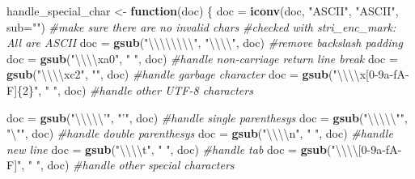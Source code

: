 \documentclass[]{article}
\newenvironment{Shaded}{\begin{snugshade}}{\end{snugshade}}
\newcommand{\CharTok}[1]{\textcolor[rgb]{0.31,0.60,0.02}{#1}}
\newcommand{\CommentTok}[1]{\textcolor[rgb]{0.56,0.35,0.01}{\textit{#1}}}
\newcommand{\ControlFlowTok}[1]{\textcolor[rgb]{0.13,0.29,0.53}{\textbf{#1}}}
\newcommand{\DataTypeTok}[1]{\textcolor[rgb]{0.13,0.29,0.53}{#1}}
\newcommand{\KeywordTok}[1]{\textcolor[rgb]{0.13,0.29,0.53}{\textbf{#1}}}
\newcommand{\NormalTok}[1]{#1}
\newcommand{\StringTok}[1]{\textcolor[rgb]{0.31,0.60,0.02}{#1}}
\begin{document}
\begin{Shaded}
\begin{Highlighting}[]
\NormalTok{handle_special_char <-}\StringTok{ }\ControlFlowTok{function}\NormalTok{(doc)}
\NormalTok{\{}
\NormalTok{  doc =}\StringTok{ }\KeywordTok{iconv}\NormalTok{(doc, }\StringTok{"ASCII"}\NormalTok{, }\StringTok{"ASCII"}\NormalTok{, }\DataTypeTok{sub=}\StringTok{""}\NormalTok{) }\CommentTok{#make sure there are no invalid chars}
                                             \CommentTok{#checked with stri_enc_mark: All are ASCII}
\NormalTok{  doc =}\StringTok{ }\KeywordTok{gsub}\NormalTok{(}\StringTok{"}\CharTok{\textbackslash{}\textbackslash{}\textbackslash{}\textbackslash{}\textbackslash{}\textbackslash{}\textbackslash{}\textbackslash{}}\StringTok{"}\NormalTok{, }\StringTok{"}\CharTok{\textbackslash{}\textbackslash{}\textbackslash{}\textbackslash{}}\StringTok{"}\NormalTok{, doc) }\CommentTok{#remove backslash padding}
\NormalTok{  doc =}\StringTok{ }\KeywordTok{gsub}\NormalTok{(}\StringTok{"}\CharTok{\textbackslash{}\textbackslash{}\textbackslash{}\textbackslash{}}\StringTok{xa0"}\NormalTok{, }\StringTok{" "}\NormalTok{, doc) }\CommentTok{#handle non-carriage return line break}
\NormalTok{  doc =}\StringTok{ }\KeywordTok{gsub}\NormalTok{(}\StringTok{"}\CharTok{\textbackslash{}\textbackslash{}\textbackslash{}\textbackslash{}}\StringTok{xc2"}\NormalTok{, }\StringTok{""}\NormalTok{, doc) }\CommentTok{#handle garbage character}
\NormalTok{  doc =}\StringTok{ }\KeywordTok{gsub}\NormalTok{(}\StringTok{"}\CharTok{\textbackslash{}\textbackslash{}\textbackslash{}\textbackslash{}}\StringTok{x[0-9a-fA-F]\{2\}"}\NormalTok{, }\StringTok{" "}\NormalTok{, doc) }\CommentTok{#handle other UTF-8 characters}
  
\NormalTok{  doc =}\StringTok{ }\KeywordTok{gsub}\NormalTok{(}\StringTok{"}\CharTok{\textbackslash{}\textbackslash{}\textbackslash{}\textbackslash{}\textbackslash{}'}\StringTok{"}\NormalTok{, }\StringTok{"'"}\NormalTok{, doc) }\CommentTok{#handle single parenthesys}
\NormalTok{  doc =}\StringTok{ }\KeywordTok{gsub}\NormalTok{(}\StringTok{"}\CharTok{\textbackslash{}\textbackslash{}\textbackslash{}\textbackslash{}\textbackslash{}"}\StringTok{"}\NormalTok{, }\StringTok{"}\CharTok{\textbackslash{}"}\StringTok{"}\NormalTok{, doc) }\CommentTok{#handle double parenthesys}
\NormalTok{  doc =}\StringTok{ }\KeywordTok{gsub}\NormalTok{(}\StringTok{"}\CharTok{\textbackslash{}\textbackslash{}\textbackslash{}\textbackslash{}}\StringTok{n"}\NormalTok{, }\StringTok{" "}\NormalTok{, doc) }\CommentTok{#handle new line}
\NormalTok{  doc =}\StringTok{ }\KeywordTok{gsub}\NormalTok{(}\StringTok{"}\CharTok{\textbackslash{}\textbackslash{}\textbackslash{}\textbackslash{}}\StringTok{t"}\NormalTok{, }\StringTok{" "}\NormalTok{, doc) }\CommentTok{#handle tab}
\NormalTok{  doc =}\StringTok{ }\KeywordTok{gsub}\NormalTok{(}\StringTok{"}\CharTok{\textbackslash{}\textbackslash{}\textbackslash{}\textbackslash{}}\StringTok{[0-9a-fA-F]"}\NormalTok{, }\StringTok{" "}\NormalTok{, doc) }\CommentTok{#handle other special characters}
  

\end{Highlighting}
\end{Shaded}
\end{document}

